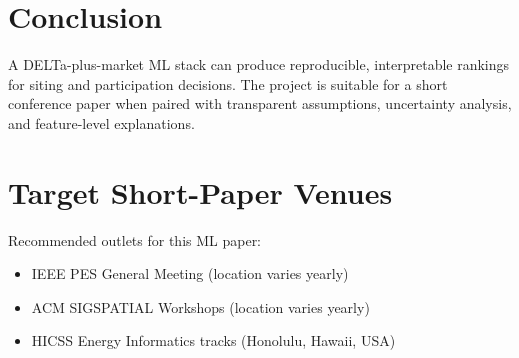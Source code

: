 \documentclass[11pt]{article}
\begin{document}
\section{Conclusion}
A DELTa-plus-market ML stack can produce reproducible, interpretable rankings for siting and participation decisions. The project is suitable for a short conference paper when paired with transparent assumptions, uncertainty analysis, and feature-level explanations.

\section{Target Short-Paper Venues}
Recommended outlets for this ML paper:
\begin{itemize}
    \item IEEE PES General Meeting (location varies yearly)
    \item ACM SIGSPATIAL Workshops (location varies yearly)
    \item HICSS Energy Informatics tracks (Honolulu, Hawaii, USA)
\end{itemize}
\end{document}

